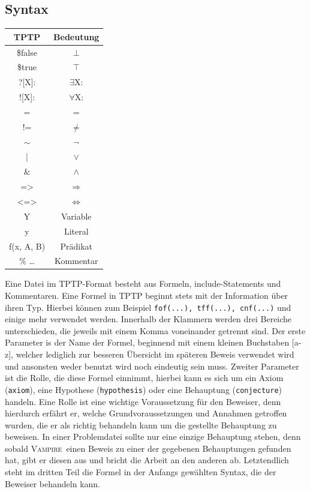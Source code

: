 \documentclass{article}
\newcommand{\vampire}{\textsc{Vampire}~}
\begin{document}
\subsection{Syntax}
\label{subsec:syntax}
\begin{table}
\begin{tabular}{|c|c|}
	\hline TPTP & Bedeutung \\ 
	\hline \$false & $\bot$\\
	\hline \$true & $\top$\\
	\hline ?[X]: & $\exists$X: \\
	\hline ![X]: & $\forall$X: \\
	\hline = & = \\
	\hline != & $\neq$ \\
	\hline $\sim$ & $\lnot$ \\
	\hline | & $\lor$ \\
	\hline \& & $\land$ \\
	\hline => & $\Rightarrow$ \\
	\hline <=> & $\Leftrightarrow$ \\
	\hline Y & Variable \\
	\hline y & Literal \\
	\hline f(x, A, B) & Prädikat \\
	\hline \% \dots & Kommentar \\
	\hline
\end{tabular} 
\end{table}
Eine Datei im TPTP-Format besteht aus Formeln, include-Statements und Kommentaren.
Eine Formel in TPTP beginnt stets mit der Information über ihren Typ. Hierbei können zum Beispiel \texttt{fof(...), tff(...), cnf(...)} und einige mehr verwendet werden.
Innerhalb der Klammern werden drei Bereiche unterschieden, die jeweils mit einem Komma voneinander getrennt sind. 
Der erste Parameter is der Name der Formel, beginnend mit einem kleinen Buchstaben [a-z], welcher lediglich zur besseren Übersicht im späteren Beweis verwendet wird und ansonsten weder benutzt wird noch eindeutig sein muss.
Zweiter Parameter ist die Rolle, die diese Formel einnimmt, hierbei kann es sich um ein Axiom (\texttt{axiom}), eine Hypothese (\texttt{hypothesis}) oder eine Behauptung (\texttt{conjecture}) handeln.
Eine Rolle ist eine wichtige Voraussetzung für den Beweiser, denn hierdurch erfährt er, welche Grundvoraussetzungen und Annahmen getroffen wurden, die er als richtig behandeln kann um die gestellte Behauptung zu beweisen.
In einer Problemdatei sollte nur eine einzige Behauptung stehen, denn sobald \vampire einen Beweis zu einer der gegebenen Behauptungen gefunden hat, gibt er diesen aus und bricht die Arbeit an den anderen ab.
Letztendlich steht im dritten Teil die Formel in der Anfangs gewählten Syntax, die der Beweiser behandeln kann. \cite[S. 4-5]{cav2013}
\end{document}
